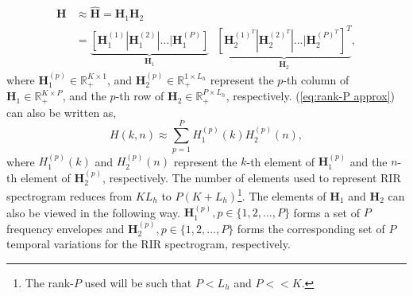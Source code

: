 \begin{align}
\mathbf{H}&\approx\mathbf{\hat{H}}=\mathbf{H}_1\mathbf{H}_2 \nonumber \\
		  &=\underbrace{[\mathbf{H}_1^{(1)} | \mathbf{H}_1^{(2)} | ...|\mathbf{H}_1^{(P)} ]}_\textrm{$\mathbf{H}_1$} \text{ }
		  \underbrace{[\mathbf{H}_2^{(1)^T} | \mathbf{H}_2^{(2)^T} | ...|\mathbf{H}_2^{(P)^T} ]^T}_\textrm{$\mathbf{H}_2$},
\label{eq:rank-P approx}
\end{align}
where $\mathbf{H}_1^{(p)}\in \mathbb{R}_+^{K \times 1}$, and $\mathbf{H}_2^{(p)}\in \mathbb{R}_+^{1 \times L_h}$ represent the $p$-th column of $\mathbf{H}_1\in \mathbb{R}_+^{K \times P}$, and the $p$-th row of $\mathbf{H}_2\in \mathbb{R}_+^{P \times L_h}$, respectively. (\ref{eq:rank-P approx}) can also be written as,
\begin{equation}
H(k,n) \approx \sum_{p=1}^P H_1^{(p)}(k)H_2^{(p)}(n),
\label{eq:rank-P approx1}
\end{equation}
where $H_1^{(p)}(k)$ and $H_2^{(p)}(n)$ represent the $k$-th element of $\mathbf{H}^{(p)}_1$ and the $n$-th element of $\mathbf{H}^{(p)}_2$, respectively. 
The number of elements used to represent RIR spectrogram reduces from $KL_h$ to $P(K + L_h)$\footnote{The rank-$P$ used will be such that $P<L_h$ and $P << K$.}.
The elements of $\mathbf{H}_1$ and $\mathbf{H}_2$ can also be viewed in the following way. $\mathbf{H}_1^{(p)}, p \in \{1,2,...,P\}$ forms a set of $P$ frequency envelopes and $\mathbf{H}_2^{(p)}, p \in \{1,2,...,P\}$ forms the corresponding set of $P$ temporal variations for the RIR spectrogram, respectively. 

